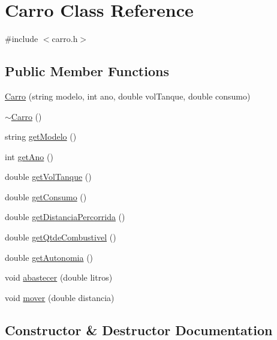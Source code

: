 \hypertarget{classCarro}{}\section{Carro Class Reference}
\label{classCarro}


{\ttfamily \#include $<$carro.\+h$>$}

\subsection*{Public Member Functions}
\begin{DoxyCompactItemize}
\item 
\hyperlink{classCarro_a55fda24c96727a586bbd99034908927b}{Carro} (string modelo, int ano, double vol\+Tanque, double consumo)
\item 
\hyperlink{classCarro_a7e31c4a7fba7088be8cef8b499c128bd}{$\sim$\+Carro} ()
\item 
string \hyperlink{classCarro_a0c9661ec805d8178927221eeae106227}{get\+Modelo} ()
\item 
int \hyperlink{classCarro_ad8ee3c0f53d6c3014cf7e70eaa310fbf}{get\+Ano} ()
\item 
double \hyperlink{classCarro_ad859d4f2e5e81627260d39a5c840d6bb}{get\+Vol\+Tanque} ()
\item 
double \hyperlink{classCarro_ab06a80b2cde333e2d8b3b4300510585a}{get\+Consumo} ()
\item 
double \hyperlink{classCarro_a7577028b357df8ca0207096c2f7086da}{get\+Distancia\+Percorrida} ()
\item 
double \hyperlink{classCarro_a1150918964334e854ac75bab0f6ca3c9}{get\+Qtde\+Combustivel} ()
\item 
double \hyperlink{classCarro_ab078cb1517fac448d0700601c4d90357}{get\+Autonomia} ()
\item 
void \hyperlink{classCarro_a1e7b1b9338a7f6e3a63924f8a5a97ae3}{abastecer} (double litros)
\item 
void \hyperlink{classCarro_aae2b769087b2604569d393886e61dfa2}{mover} (double distancia)
\end{DoxyCompactItemize}


\subsection{Constructor \& Destructor Documentation}
\mbox{\label{classCarro_a55fda24c96727a586bbd99034908927b}} 
